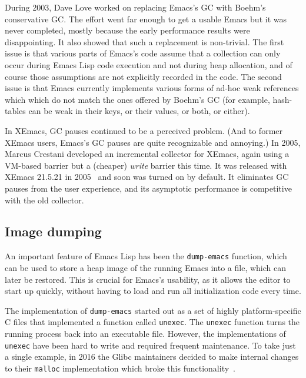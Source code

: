 \documentclass[format=acmsmall, review]{acmart}
\newcommand \Elisp {Emacs Lisp}
\begin{document}
During 2003, Dave Love worked on replacing Emacs's GC with Boehm's
conservative GC.  The effort went far enough to get a usable Emacs but it
was never completed, mostly because the early performance results were
disappointing.  It also showed that such a replacement is non-trivial.
The first issue is that various parts of Emacs's code assume that
a collection can only occur during \Elisp{} code execution and not during
heap allocation, and of course those assumptions are not explicitly recorded
in the code.  The second issue is that Emacs currently implements various
forms of ad-hoc weak references which which do not match the ones
offered by Boehm's GC (for example, hash-tables can be weak in their keys,
or their values, or both, or either).

\label{sec:incremental-gc}
In XEmacs, GC pauses continued to be a perceived problem.  (And to
former XEmacs users, Emacs's GC pauses are quite recognizable and
annoying.)
In 2005, Marcus Crestani developed an incremental collector for XEmacs,
again using a VM-based barrier but a (cheaper) \emph{write} barrier this time.
It was released with XEmacs 21.5.21 in
2005~\cite{Crestani2005} and soon was turned on by default.  It
eliminates GC pauses from the user experience, and its asymptotic
performance is competitive with the old collector.

\subsection{Image dumping}
\label{sec:image-dumping}

An important feature of \Elisp{} has been the \texttt{dump-emacs}
function, which can be used to store a heap image of the running Emacs
into a file, which can later be restored.  This is crucial for Emacs's
usability, as it allows the editor to start up quickly, without
having to load and run all initialization code every time.

The implementation of \texttt{dump-emacs} started out as a set of highly
platform-specific C files that implemented a function called
\texttt{unexec}.  The \texttt{unexec} function turns the running process
back into an executable file.  However, the implementations of
\texttt{unexec} have been hard to write and required frequent maintenance.
To take just a single example, in 2016 the Glibc maintainers decided to make
internal changes to their \texttt{malloc} implementation which broke this
functionality~\cite{UnexecGlibc}.
\end{document}
